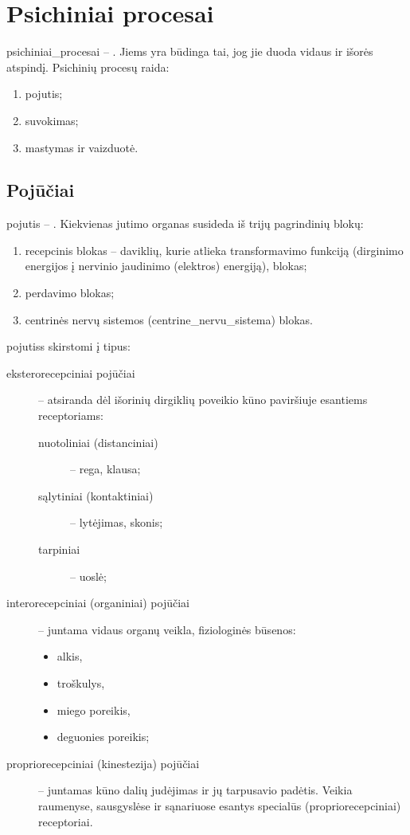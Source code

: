 \chapter{Psichiniai procesai}

\label{tema:psichiniai_procesai}

\Gls{psichiniai_procesai} – . Jiems yra 
būdinga tai, jog jie duoda vidaus ir išorės atspindį. Psichinių procesų
raida:
\begin{enumerate}
  \item \gls{pojutis};
  \item \gls{suvokimas};
  \item \gls{mastymas} ir vaizduotė.
\end{enumerate}

\section{Pojūčiai}

\label{tema:pojuciai}

\Gls{pojutis} – . Kiekvienas jutimo organas
susideda iš trijų pagrindinių blokų:
\begin{enumerate}
  \item recepcinis blokas – daviklių, kurie atlieka transformavimo funkciją 
    (dirginimo energijos į nervinio jaudinimo (elektros) energiją), blokas;
  \item perdavimo blokas;
  \item centrinės nervų sistemos (\gls{centrine_nervu_sistema}) blokas.
\end{enumerate}

\Glspl{pojutis} skirstomi į tipus: 
\begin{description}
  \item[eksterorecepciniai pojūčiai] – atsiranda dėl išorinių dirgiklių
    poveikio kūno paviršiuje esantiems receptoriams:
    \begin{description}
      \item[nuotoliniai (distanciniai)] – rega, klausa;
      \item[sąlytiniai (kontaktiniai)] – lytėjimas, skonis;
      \item[tarpiniai] – uoslė;
    \end{description}
  \item[interorecepciniai (organiniai) pojūčiai] – juntama vidaus organų
    veikla, fiziologinės būsenos:
    \begin{itemize}
      \item alkis,
      \item troškulys,
      \item miego poreikis,
      \item deguonies poreikis;
    \end{itemize}
  \item[propriorecepciniai (\gls{kinestezija}) pojūčiai] – juntamas kūno
    dalių judėjimas ir jų tarpusavio padėtis. Veikia raumenyse, sausgyslėse
    ir sąnariuose esantys specialūs (propriorecepciniai) receptoriai.
\end{description}

